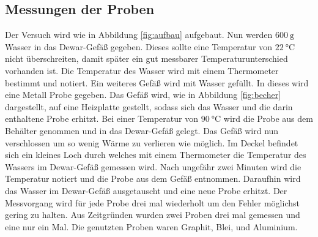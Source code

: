 \subsection{Messungen der Proben}
Der Versuch wird wie in Abbildung \ref{fig:aufbau} aufgebaut.
Nun werden $\SI{600}{\gram}$ Wasser in das Dewar-Gefäß gegeben.
Dieses sollte eine Temperatur von $\SI{22}{\celsius}$ nicht überschreiten, damit später ein gut messbarer Temperaturunterschied vorhanden ist.
Die Temperatur des Wasser wird mit einem Thermometer bestimmt und notiert.
Ein weiteres Gefäß wird mit Wasser gefüllt. 
In dieses wird eine Metall Probe gegeben.
Das Gefäß wird, wie in Abbildung \ref{fig:becher} dargestellt, auf eine Heizplatte gestellt, sodass sich das Wasser und die darin enthaltene Probe erhitzt.
Bei einer Temperatur von $\SI{90}{\celsius}$ wird die Probe aus dem Behälter genommen und in das Dewar-Gefäß gelegt.
Das Gefäß wird nun verschlossen um so wenig Wärme zu verlieren wie möglich.
Im Deckel befindet sich ein kleines Loch durch welches mit einem Thermometer die Temperatur des Wassers im Dewar-Gefäß gemessen wird.
Nach ungefähr zwei Minuten wird die Temperatur notiert und die Probe aus dem Gefäß entnommen.
Daraufhin wird das Wasser im Dewar-Gefäß ausgetauscht und eine neue Probe erhitzt.
Der Messvorgang wird für jede Probe drei mal wiederholt um den Fehler möglichst gering zu halten.
Aus Zeitgründen wurden zwei Proben drei mal gemessen und eine nur ein Mal.
Die genutzten Proben waren Graphit, Blei, und Aluminium. 
